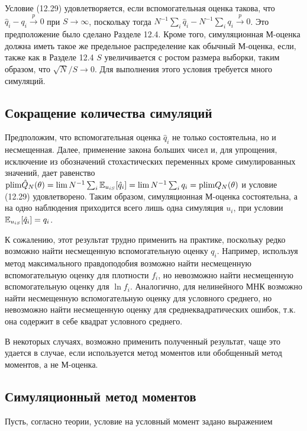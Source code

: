Условие (12.29) удовлетворяется, если вспомогательная оценка  такова, что $\hat{q}_i-q_i \stackrel{p}{\rightarrow} 0$ при $S \rightarrow \infty$, поскольку тогда $N^{-1}\sum_{i}\hat{q}_i-N^{-1}\sum_{i}q_{i}\stackrel{p}{\rightarrow} 0$. Это  предположение было сделано Разделе 12.4. Кроме того, симуляционная М-оценка должна иметь такое же предельное распределение как обычный М-оценка, если, также как в Разделе 12.4 $S$ увеличивается с ростом размера выборки, таким образом, что $\sqrt{N}/S \rightarrow 0$. Для выполнения этого условия требуется много симуляций.

\subsection{Сокращение количества симуляций}

Предположим, что вспомогательная оценка $\hat{q}_i$ не только состоятельна, но и несмещенная. Далее, применение закона больших чисел и, для упрощения, исключение из обозначений стохастических переменных кроме симулированных значений, дает равенство $\mathrm{plim }{\hat{Q}_N}(\theta)=\lim{N^{-1}\sum_{i}\mathbb{E}_{u_{iS}}[\hat{q}_i]}=\lim{N^{-1}}\sum_{i}q_i=\mathrm{plim }{Q_{N}(\theta)}$ и условие (12.29) удовлетворено. Таким образом, симуляционная М-оценка  состоятельна, а на одно наблюдения приходится всего лишь одна симуляция $u_i$, при условии $\mathbb{E}_{u_{iS}}[\hat{q}_i]=q_i$.

К сожалению, этот результат трудно применить на практике, поскольку редко возможно найти несмещенную вспомогательную оценку $q_i$. Например, используя метод максимального правдоподобия возможно найти несмещенную вспомогательную оценку для плотности $f_i$, но невозможно найти несмещенную вспомогательную оценку для $\ln{f_i}$. Аналогично, для нелинейного МНК  возможно найти несмещенную вспомогательную оценку для условного среднего, но невозможно найти несмещенную оценку для среднеквадратических ошибок, т.к. она содержит в себе квадрат условного среднего. 

В некоторых случаях, возможно применить полученный результат, чаще это удается в случае, если используется метод моментов или обобщенный метод моментов, а не М-оценка.

\subsection{Симуляционный метод моментов}

Пусть, согласно теории, условие на условный момент задано выражением

